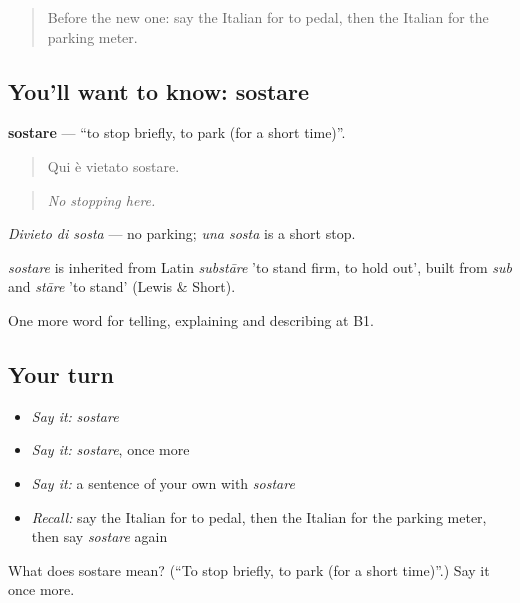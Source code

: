 \label{lesson:IT-C416-sostare}



\begin{quote}
Before the new one: say the Italian for to pedal, then the Italian for the parking meter.
\end{quote}

\subsection*{You'll want to know: sostare}
\textbf{sostare} — \textquotedblleft{}to stop briefly, to park (for a short time)\textquotedblright{}.

\begin{quote}
Qui è vietato sostare.
\end{quote}

\begin{quote}
\emph{No stopping here.}
\end{quote}

\emph{Divieto di sosta} — no parking; \emph{una sosta} is a short stop.

\begin{cousinweb}
\emph{sostare} is inherited from Latin \emph{substāre} 'to stand firm, to hold out', built from \emph{sub} and \emph{stāre} 'to stand' (Lewis \& Short).
\end{cousinweb}

\begin{grammarlens}[title={What you've built}]
One more word for telling, explaining and describing at B1.
\end{grammarlens}

\subsection*{Your turn}
\begin{itemize}
\raggedright
  \item \emph{Say it:} \emph{sostare}
  \item \emph{Say it:} \emph{sostare}, once more
  \item \emph{Say it:} a sentence of your own with \emph{sostare}
  \item \emph{Recall:} say the Italian for to pedal, then the Italian for the parking meter, then say \emph{sostare} again
\end{itemize}

\begin{tcolorbox}[breakable,colback=teal!4,colframe=teal!35!black,title={Before you move on}]
What does sostare mean? (\textquotedblleft{}To stop briefly, to park (for a short time)\textquotedblright{}.) Say it once more.
\end{tcolorbox}
